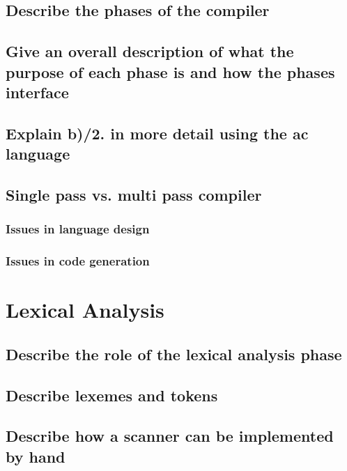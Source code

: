 \documentclass{article}
\begin{document}
\subsection{Describe the phases of the compiler}

\subsection{Give an overall description of what the purpose of each phase is and how the phases interface}

\subsection{Explain b)/2. in more detail using the ac language}

\subsection{Single pass vs. multi pass compiler}

\subsubsection{Issues in language design}

\subsubsection{Issues in code generation}

\pagebreak

\section{Lexical Analysis}

\subsection{Describe the role of the lexical analysis phase}

\subsection{Describe lexemes and tokens}

\subsection{Describe how a scanner can be implemented by hand}
\end{document}
